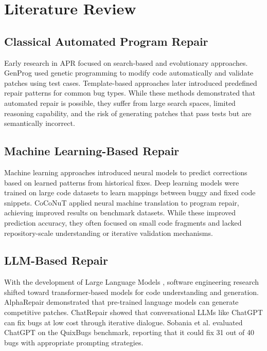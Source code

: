 \documentclass[conference]{IEEEtran}
\begin{document}
\section{Literature Review}

\subsection{Classical Automated Program Repair}
Early research in APR focused on search-based and evolutionary approaches. GenProg \cite{genprog} used genetic programming to modify code automatically and validate patches using test cases. Template-based approaches \cite{templateapr} later introduced predefined repair patterns for common bug types. While these methods demonstrated that automated repair is possible, they suffer from large search spaces, limited reasoning capability, and the risk of generating patches that pass tests but are semantically incorrect.

\subsection{Machine Learning-Based Repair}
Machine learning approaches introduced neural models to predict corrections based on learned patterns from historical fixes. Deep learning models were trained on large code datasets to learn mappings between buggy and fixed code snippets. CoCoNuT \cite{coconut} applied neural machine translation to program repair, achieving improved results on benchmark datasets. While these improved prediction accuracy, they often focused on small code fragments and lacked repository-scale understanding or iterative validation mechanisms.

\subsection{LLM-Based Repair}
With the development of Large Language Models \cite{transformer, codex}, software engineering research shifted toward transformer-based models for code understanding and generation. AlphaRepair \cite{alpharepair} demonstrated that pre-trained language models can generate competitive patches. ChatRepair \cite{chatrepair} showed that conversational LLMs like ChatGPT can fix bugs at low cost through iterative dialogue. Sobania et al. \cite{chatgptapr} evaluated ChatGPT on the QuixBugs benchmark, reporting that it could fix 31 out of 40 bugs with appropriate prompting strategies.
\end{document}
